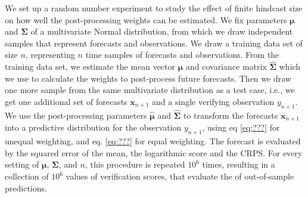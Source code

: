 \documentclass[12pt]{article}
\renewcommand{\vec}[1]{\bm{#1}}
\newcommand{\mat}[1]{\bm{#1}}
\begin{document}
We set up a random number experiment to study the effect of finite hindcast size on how well the post-processing weights can be estimated.
We fix parameters $\vec{\mu}$ and $\mat{\Sigma}$ of a multivariate Normal distribution, from which we draw independent samples that represent forecasts and observations.
We draw a training data set of size $n$, representing $n$ time samples of forecasts and observations.
From the training data set, we estimate the mean vector $\hat{\vec{\mu}}$ and covariance matrix $\hat{\mat{\Sigma}}$ which we use to calculate the weights to post-process future forecasts.
Then we draw one more sample from the same multivariate distribution as a test case, i.e., we get one additional set of forecasts $\vec{x}_{n+1}$ and a single verifying observation $y_{n+1}$.
We use the post-processing parameters $\hat{\vec{\mu}}$ and $\hat{\mat{\Sigma}}$ to transform the forecasts $\vec{x}_{n+1}$ into a predictive distribution for the observation $y_{n+1}$, using eq \ref{eq:???} for unequal weighting, and eq. \ref{eq:???} for equal weighting.
The forecast is evaluated by the squared error of the mean, the logarithmic score and the CRPS.
For every setting of $\vec{\mu}$, $\mat{\Sigma}$, and $n$, this procedure is repeated $10^6$ times, resulting in a collection of $10^6$ values of verification scores, that evaluate the of out-of-sample predictions.
\end{document}
